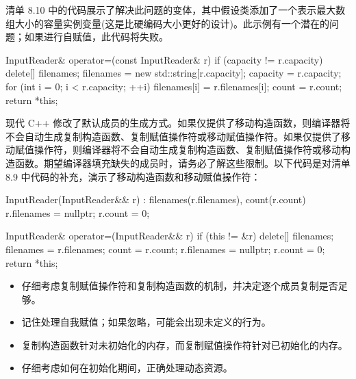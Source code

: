 清单 8.10 中的代码展示了解决此问题的变体，其中假设类添加了一个表示最大数组大小的容量实例变量(这是比硬编码大小更好的设计)。此示例有一个潜在的问题；如果进行自赋值，此代码将失败。


\begin{cpp}
InputReader& operator=(const InputReader& r) {
  if (capacity != r.capacity) {
    delete[] filenames;
    filenames = new std::string[r.capacity];
    capacity = r.capacity;
  }
  for (int i = 0; i < r.capacity; ++i)
    filenames[i] = r.filenames[i];
  count = r.count;
  return *this;
}
\end{cpp}

现代 C++ 修改了默认成员的生成方式。如果仅提供了移动构造函数，则编译器将不会自动生成复制构造函数、复制赋值操作符或移动赋值操作符。如果仅提供了移动赋值操作符，则编译器将不会自动生成复制构造函数、复制赋值操作符或移动构造函数。期望编译器填充缺失的成员时，请务必了解这些限制。以下代码是对清单 8.9 中代码的补充，演示了移动构造函数和移动赋值操作符：

\begin{cpp}
InputReader(InputReader&& r) : filenames(r.filenames), count(r.count) {
  r.filenames = nullptr;
  r.count = 0;
}

InputReader& operator=(InputReader&& r) {
  if (this != &r) {
    delete[] filenames;
    filenames = r.filenames;
    count = r.count;
    r.filenames = nullptr;
    r.count = 0;
  }
  return *this;
}
\end{cpp}


\begin{itemize}
\item
仔细考虑复制赋值操作符和复制构造函数的机制，并决定逐个成员复制是否足够。

\item
记住处理自我赋值；如果忽略，可能会出现未定义的行为。

\item
复制构造函数针对未初始化的内存，而复制赋值操作符针对已初始化的内存。

\item
仔细考虑如何在初始化期间，正确处理动态资源。
\end{itemize}










